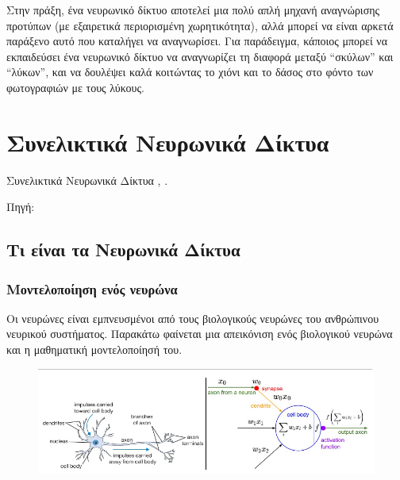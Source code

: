 Στην πράξη, ένα νευρωνικό δίκτυο αποτελεί μια πολύ απλή μηχανή αναγνώρισης προτύπων (με εξαιρετικά περιορισμένη χωρητικότητα), αλλά μπορεί να είναι αρκετά παράξενο αυτό που καταλήγει να αναγνωρίσει. Για παράδειγμα, κάποιος μπορεί να εκπαιδεύσει ένα νευρωνικό δίκτυο να αναγνωρίζει τη διαφορά μεταξύ “σκύλων” και “λύκων”, και να δουλέψει καλά κοιτώντας το χιόνι και το δάσος στο φόντο των φωτογραφιών με τους λύκους.

\section{Συνελικτικά Νευρωνικά Δίκτυα}
Συνελικτικά Νευρωνικά Δίκτυα ,  \cite{cs231n}.

Πηγή:
\begin{tabbing}
\end{tabbing}

\subsection{Τι είναι τα Νευρωνικά Δίκτυα}

\subsubsection{Μοντελοποίηση ενός νευρώνα}

Οι νευρώνες είναι εμπνευσμένοι από τους βιολογικούς νευρώνες του ανθρώπινου νευρικού συστήματος. Παρακάτω φαίνεται μια απεικόνιση ενός βιολογικού νευρώνα και η μαθηματική μοντελοποίησή του. 

\begin{figure}[!ht] 
\centering
\includegraphics[width=\textwidth]{static/figures/cs231n_neuron.png} 
\caption{}
\label{neuron model}
\end{figure}

